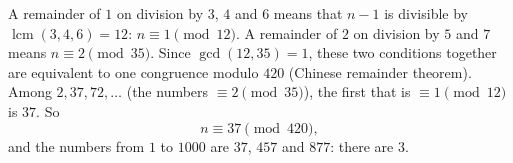 A remainder of $1$ on division by $3$, $4$ and $6$ means that $n-1$ is divisible by $\operatorname{lcm}(3,4,6)=12$: $n\equiv1\pmod{12}$. A remainder of $2$ on division by $5$ and $7$ means $n\equiv2\pmod{35}$. Since $\gcd(12,35)=1$, these two conditions together are equivalent to one congruence modulo $420$ (Chinese remainder theorem). Among $2,37,72,\dots$ (the numbers $\equiv2\pmod{35}$), the first that is $\equiv1\pmod{12}$ is $37$. So
\[n\equiv37\pmod{420},\]
and the numbers from $1$ to $1000$ are $37$, $457$ and $877$: there are $\boxed{3}$.
